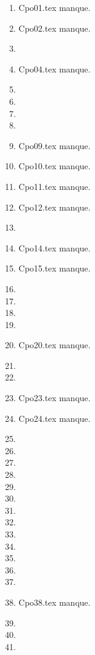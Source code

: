 \clearpage 
{}
\begin{enumerate}
  \item Cpo01.tex manque. 
  \item Cpo02.tex manque. 
  \item  
  \item Cpo04.tex manque. 
  \item  
  \item  
  \item  
  \item  
  \item Cpo09.tex manque. 
  \item Cpo10.tex manque. 
  \item Cpo11.tex manque. 
  \item Cpo12.tex manque. 
  \item  
  \item Cpo14.tex manque. 
  \item Cpo15.tex manque. 
  \item  
  \item  
  \item  
  \item  
  \item Cpo20.tex manque. 
  \item  
  \item  
  \item Cpo23.tex manque. 
  \item Cpo24.tex manque. 
  \item  
  \item  
  \item  
  \item  
  \item  
  \item  
  \item  
  \item  
  \item  
  \item  
  \item  
  \item  
  \item  
  \item Cpo38.tex manque. 
  \item  
  \item  
  \item  
\end{enumerate} 
